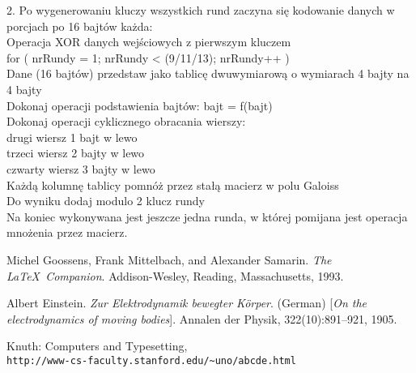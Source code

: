 \documentclass[oneside]{mgr}
\begin{document}
2. Po wygenerowaniu kluczy wszystkich rund zaczyna się kodowanie danych w porcjach po 16 bajtów każda:\\
\hspace*{1 cm}Operacja XOR danych wejściowych z pierwszym kluczem\\
\hspace*{1 cm}for ( nrRundy = 1; nrRundy < (9/11/13); nrRundy++ )\\
\hspace*{2 cm}Dane (16 bajtów) przedstaw jako tablicę dwuwymiarową o wymiarach 4 bajty \hspace*{2 cm}na 4 bajty\\
\hspace*{2 cm}Dokonaj operacji podstawienia bajtów: bajt = f(bajt)\\
\hspace*{2 cm}Dokonaj operacji cyklicznego obracania wierszy:\\
\hspace*{3 cm}drugi wiersz 1 bajt w lewo\\
\hspace*{3 cm}trzeci wiersz 2 bajty w lewo\\
\hspace*{3 cm}czwarty wiersz 3 bajty w lewo\\
\hspace*{2 cm}Każdą kolumnę tablicy pomnóż przez stałą macierz w polu Galoiss\\
\hspace*{2 cm}Do wyniku dodaj modulo 2 klucz rundy\\
Na koniec wykonywana jest jeszcze jedna runda, w której pomijana jest  operacja mnożenia przez macierz.





\begin{thebibliography}{9}
Michel Goossens, Frank Mittelbach, and Alexander Samarin. 
\textit{The \LaTeX\ Companion}. 
Addison-Wesley, Reading, Massachusetts, 1993.
 
Albert Einstein. 
\textit{Zur Elektrodynamik bewegter K{\"o}rper}. (German) 
[\textit{On the electrodynamics of moving bodies}]. 
Annalen der Physik, 322(10):891–921, 1905.
 
Knuth: Computers and Typesetting,
\\\texttt{http://www-cs-faculty.stanford.edu/\~{}uno/abcde.html}
\end{thebibliography}
\end{document}
